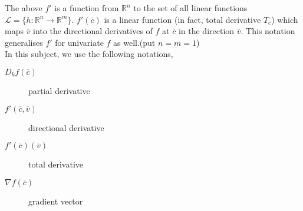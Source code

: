 \begin{note}
	The above $f'$ is a function from $\mathbb{R}^n$ to the set of all linear functions \( \mathscr{L} = \{ h : \mathbb{R}^n \to \mathbb{R}^m\} \). $f'(\overline{c})$ is a linear function (in fact, total derivative $T_{\overline{c}}$) which maps $\overline{v}$ into the directional derivatives of $f$ at $\overline{c}$ in the direction $\overline{v}$. This notation generalises $f'$ for univariate $f$ as well.(put $n=m=1$)\\

	In this subject, we use the following notations,
	\begin{description}
		\item[$D_kf(\overline{c})$] partial derivative
		\item[$f'(\overline{c},\overline{v})$] directional derivative
		\item[$f'(\overline{c})(\overline{v})$] total derivative
		\item[$\nabla{}f(\overline{c})$] gradient vector
	\end{description}
\end{note}

